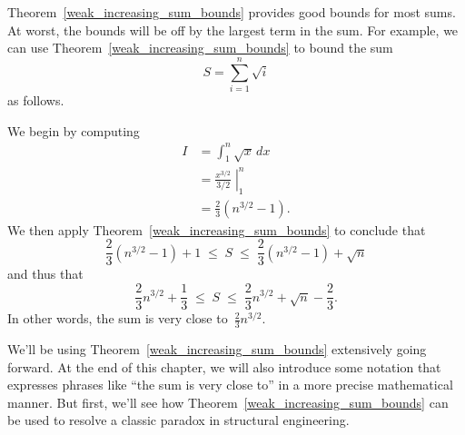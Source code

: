 \iffalse

\begin{figure}

\subfloat[]{\graphic{Fig_G9-a}}

\subfloat[]{\graphic{Fig_G9-b}}

\subfloat[]{\graphic{Fig_G9-c}}

\caption{The area of the shaded region in~(a) is $S = \sum_{i = 1}^n
  f(i)$.  The area in the shaded regions in (b) and~(c) is $I =
  \int_1^n f(x)\,dx$.}

\label{fig:9G9}

\end{figure}
\fi

Theorem~\ref{weak_increasing_sum_bounds} provides good bounds for most sums.  At worst,
the bounds will be off by the largest term in the sum.  For example,
we can use Theorem~\ref{weak_increasing_sum_bounds} to bound the sum
\[
    S = \sum_{i = 1}^n \sqrt{i}
\]
as follows.

We begin by computing
\begin{align*}
    I   &= \int_1^n \sqrt{x} \, dx \\
        &= \left. \frac{x^{3/2}}{3/2} \; \right|_1^n \\
        &= \frac{2}{3} (n^{3/2} - 1).
\end{align*}
We then apply Theorem~\ref{weak_increasing_sum_bounds} to conclude that
\[
    \frac{2}{3} (n^{3/2} - 1) + 1
    \; \le \; S
    \; \le \; \frac{2}{3} (n^{3/2} - 1) + \sqrt{n}
\]
and thus that
\[
    \frac{2}{3} n^{3/2} + \frac{1}{3}
    \; \le \; S
    \; \le \; \frac{2}{3} n^{3/2} + \sqrt{n} - \frac{2}{3}.
\]
In other words, the sum is very close to~$\frac{2}{3} n^{3/2}$.

We'll be using Theorem~\ref{weak_increasing_sum_bounds} extensively going forward.  At
the end of this chapter, we will also introduce some notation that
expresses phrases like ``the sum is very close to'' in a more precise
mathematical manner.  But first, we'll see how Theorem~\ref{weak_increasing_sum_bounds}
can be used to resolve a classic paradox in structural engineering.

\begin{problems}

\examproblems
{}

\homeworkproblems
{}

\end{problems}


